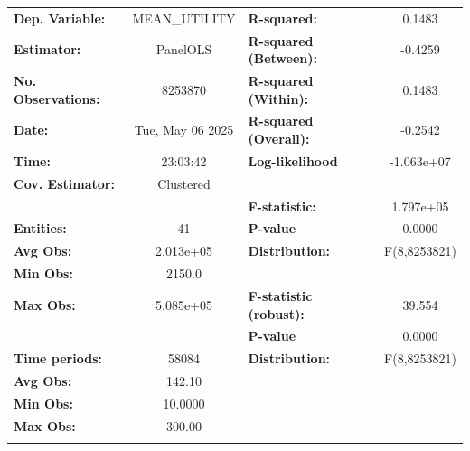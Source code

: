 \begin{center}
\begin{tabular}{lclc}
\toprule
\textbf{Dep. Variable:}       &   MEAN\_UTILITY    & \textbf{  R-squared:         }   &      0.1483      \\
\textbf{Estimator:}           &      PanelOLS      & \textbf{  R-squared (Between):}  &     -0.4259      \\
\textbf{No. Observations:}    &      8253870       & \textbf{  R-squared (Within):}   &      0.1483      \\
\textbf{Date:}                &  Tue, May 06 2025  & \textbf{  R-squared (Overall):}  &     -0.2542      \\
\textbf{Time:}                &      23:03:42      & \textbf{  Log-likelihood     }   &    -1.063e+07    \\
\textbf{Cov. Estimator:}      &     Clustered      & \textbf{                     }   &                  \\
\textbf{}                     &                    & \textbf{  F-statistic:       }   &    1.797e+05     \\
\textbf{Entities:}            &         41         & \textbf{  P-value            }   &      0.0000      \\
\textbf{Avg Obs:}             &     2.013e+05      & \textbf{  Distribution:      }   &   F(8,8253821)   \\
\textbf{Min Obs:}             &       2150.0       & \textbf{                     }   &                  \\
\textbf{Max Obs:}             &     5.085e+05      & \textbf{  F-statistic (robust):} &      39.554      \\
\textbf{}                     &                    & \textbf{  P-value            }   &      0.0000      \\
\textbf{Time periods:}        &       58084        & \textbf{  Distribution:      }   &   F(8,8253821)   \\
\textbf{Avg Obs:}             &       142.10       & \textbf{                     }   &                  \\
\textbf{Min Obs:}             &      10.0000       & \textbf{                     }   &                  \\
\textbf{Max Obs:}             &       300.00       & \textbf{                     }   &                  \\
\textbf{}                     &                    & \textbf{                     }   &                  \\

\end{tabular}
\end{center}
